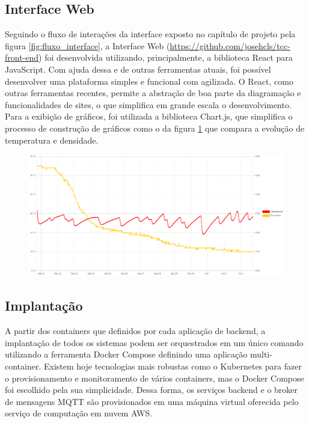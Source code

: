\subsection{Interface Web}


Seguindo o fluxo de interações da interface exposto no capítulo de projeto pela figura \ref{fig:fluxo_interface}, a Interface Web (\url{https://github.com/josehcls/tcc-front-end}) foi desenvolvida utilizando, principalmente, a biblioteca React para JavaScript. Com ajuda dessa e de outras ferramentas atuais, foi possível desenvolver uma plataforma simples e funcional com agilizada. O React, como outras ferramentas recentes, permite a abstração de boa parte da diagramação e funcionalidades de sites, o que simplifica em grande escala o desenvolvimento. Para a exibição de gráficos, foi utilizada a biblioteca Chart.js, que simplifica o processo de construção de gráficos como o da figura \ref{fig:grafico_chart} que compara a evolução de temperatura e densidade.


\begin{figure}[h]
    \centering
    \includegraphics[scale=0.4]{figuras/implementacao/software/grafico_chartjs.PNG}
    \label{fig:grafico_chart}
\end{figure}


\subsection{Implantação}


A partir dos containers que definidos por cada aplicação de backend, a implantação de todos os sistemas podem ser orquestrados em um único comando utilizando a ferramenta Docker Compose definindo uma aplicação multi-container. Existem hoje tecnologias mais robustas como o Kubernetes para fazer o provisionamento e monitoramento de vários containers, mas o Docker Compose foi escolhido pela sua simplicidade. Dessa forma, os serviços backend e o broker de mensagens MQTT são provisionados em uma máquina virtual oferecida pelo serviço de computação em nuvem AWS.


